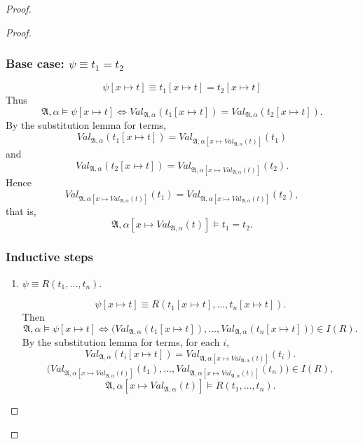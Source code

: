 \documentclass{article}
\begin{document}
\begin{proof}
\begin{proof}
        \subsubsection*{Base case: $\psi \equiv t_1 = t_2$}
        \[
        \psi[x \mapsto t] \equiv t_1[x \mapsto t] = t_2[x \mapsto t]
        \]
        Thus
        \[
        \mathfrak{A}, \alpha \models \psi[x \mapsto t]
        \iff
        Val_{\mathfrak{A}, \alpha}(t_1[x \mapsto t])
        =
        Val_{\mathfrak{A}, \alpha}(t_2[x \mapsto t]).
        \]
        By the substitution lemma for terms,
        \[
        Val_{\mathfrak{A}, \alpha}(t_1[x \mapsto t])
        =
        Val_{\mathfrak{A}, \alpha[x \mapsto Val_{\mathfrak{A}, \alpha}(t)]}(t_1)
        \]
        and
        \[
        Val_{\mathfrak{A}, \alpha}(t_2[x \mapsto t])
        =
        Val_{\mathfrak{A}, \alpha[x \mapsto Val_{\mathfrak{A}, \alpha}(t)]}(t_2).
        \]
        Hence
        \[
        Val_{\mathfrak{A}, \alpha[x \mapsto Val_{\mathfrak{A}, \alpha}(t)]}(t_1)
        =
        Val_{\mathfrak{A}, \alpha[x \mapsto Val_{\mathfrak{A}, \alpha}(t)]}(t_2),
        \]
        that is,
        \[
        \mathfrak{A}, \alpha[x \mapsto Val_{\mathfrak{A}, \alpha}(t)] \models t_1 = t_2.
        \]
        
        \subsubsection*{Inductive steps}
        \begin{enumerate}
            \item $\psi \equiv R(t_1, \dots, t_n)$.
        
            \[
            \psi[x \mapsto t] \equiv R(t_1[x \mapsto t], \dots, t_n[x \mapsto t]).
            \]
            Then
            \[
            \mathfrak{A}, \alpha \models \psi[x \mapsto t]
            \iff
            \bigl(Val_{\mathfrak{A}, \alpha}(t_1[x \mapsto t]), \dots, Val_{\mathfrak{A}, \alpha}(t_n[x \mapsto t])\bigr) \in I(R).
            \]
            By the substitution lemma for terms, for each $i$,
            \[
            Val_{\mathfrak{A}, \alpha}(t_i[x \mapsto t])
            =
            Val_{\mathfrak{A}, \alpha[x \mapsto Val_{\mathfrak{A}, \alpha}(t)]}(t_i).
            \]
            \[
            \bigl(Val_{\mathfrak{A}, \alpha[x \mapsto Val_{\mathfrak{A}, \alpha}(t)]}(t_1), \dots,
            Val_{\mathfrak{A}, \alpha[x \mapsto Val_{\mathfrak{A}, \alpha}(t)]}(t_n)\bigr) \in I(R),
            \]
            \[
            \mathfrak{A}, \alpha[x \mapsto Val_{\mathfrak{A}, \alpha}(t)] \models R(t_1, \dots, t_n).
            \]
        

\end{enumerate}
\end{proof}
\end{proof}
\end{document}
